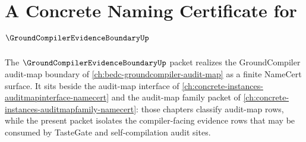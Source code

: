 \chapter{A Concrete Naming Certificate for $\GroundCompilerEvidenceBoundaryUp$}
\label{ch:concrete-instances-groundcompilerevidenceboundary-namecert}

The $\GroundCompilerEvidenceBoundaryUp$ packet realizes the GroundCompiler audit-map boundary of \autoref{ch:bedc-groundcompiler-audit-map} as a finite NameCert surface. It sits beside the audit-map interface of \autoref{ch:concrete-instances-auditmapinterface-namecert} and the audit-map family packet of \autoref{ch:concrete-instances-auditmapfamily-namecert}: those chapters classify audit-map rows, while the present packet isolates the compiler-facing evidence rows that may be consumed by TasteGate and self-compilation audit sites.

